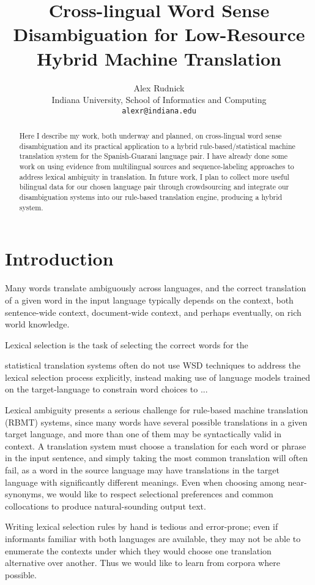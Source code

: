 \documentclass{article}
\title{Cross-lingual Word Sense Disambiguation for Low-Resource Hybrid Machine
Translation}
\author{Alex Rudnick \\
	    Indiana University, School of Informatics and Computing \\
	    {\tt alexr@indiana.edu}}
\date{}
\begin{document}
\maketitle

\begin{abstract}
Here I describe my work, both underway and planned, on cross-lingual word sense
disambiguation and its practical application to a hybrid rule-based/statistical
machine translation system for the Spanish-Guarani language pair. I have
already done some work on using evidence from multilingual sources and
sequence-labeling approaches to address lexical ambiguity in translation. In
future work, I plan to collect more useful bilingual data for our chosen
language pair through crowdsourcing and integrate our disambiguation systems
into our rule-based translation engine, producing a hybrid system.
\end{abstract}

\section{Introduction}
Many words translate ambiguously across languages, and the correct translation
of a given word in the input language typically depends on the context, both
sentence-wide context, document-wide context, and perhaps eventually, on rich
world knowledge.

Lexical selection is the task of selecting the correct words for the 

statistical translation systems often do not use WSD techniques to address the
lexical selection process explicitly, instead making use of language models
trained on the target-language to constrain word choices to ...



Lexical ambiguity presents a serious challenge for rule-based machine
translation (RBMT) systems, since many words have several possible translations
in a given target language, and more than one of them may be syntactically
valid in context.
A translation system must choose a translation for each word or phrase in the
input sentence, and simply taking the most common translation will often fail,
as a word in the source language may have translations in the target language
with significantly different meanings. Even when choosing among near-synonyms,
we would like to respect selectional preferences and common collocations to
produce natural-sounding output text.

Writing lexical selection rules by hand is tedious and error-prone; even if
informants familiar with both languages are available, they may not be able to
enumerate the contexts under which they would choose one translation
alternative over another. Thus we would like to learn from corpora where
possible. 
\end{document}
